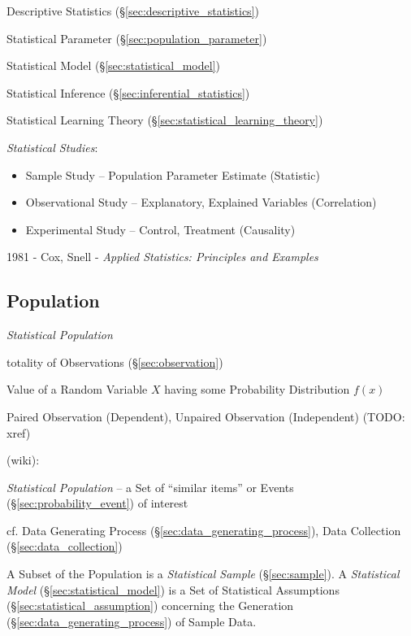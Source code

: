 Descriptive Statistics (\S\ref{sec:descriptive_statistics})

Statistical Parameter (\S\ref{sec:population_parameter})

Statistical Model (\S\ref{sec:statistical_model})

Statistical Inference (\S\ref{sec:inferential_statistics})

Statistical Learning Theory (\S\ref{sec:statistical_learning_theory})

\emph{Statistical Studies}:
\begin{itemize}
  \item Sample Study -- Population Parameter Estimate (Statistic)
  \item Observational Study -- Explanatory, Explained Variables (Correlation)
  \item Experimental Study -- Control, Treatment (Causality)
\end{itemize}

1981 - Cox, Snell - \emph{Applied Statistics: Principles and Examples}



\subsection{Population}\label{sec:population}

\emph{Statistical Population}

totality of Observations (\S\ref{sec:observation})

Value of a Random Variable $X$ having some Probability Distribution $f(x)$

Paired Observation (Dependent), Unpaired Observation (Independent) (TODO: xref)

(wiki):

\emph{Statistical Population} -- a Set of ``similar items'' or Events
(\S\ref{sec:probability_event}) of interest

\fist cf. Data Generating Process (\S\ref{sec:data_generating_process}), Data
Collection (\S\ref{sec:data_collection})

A Subset of the Population is a \emph{Statistical Sample} (\S\ref{sec:sample}).
A \emph{Statistical Model} (\S\ref{sec:statistical_model}) is a Set of
Statistical Assumptions (\S\ref{sec:statistical_assumption}) concerning the
Generation (\S\ref{sec:data_generating_process}) of Sample Data.

